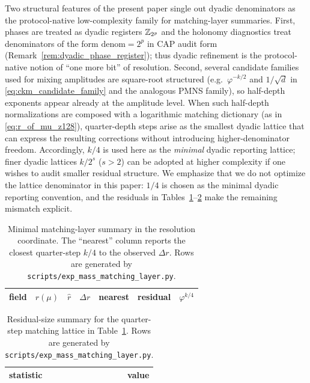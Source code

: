 \begin{remark}\label{rem:quarter_depth_minimal_dyadic}
Two structural features of the present paper single out dyadic denominators as the protocol-native low-complexity family for matching-layer summaries.
First, phases are treated as dyadic registers $\mathbb{Z}_{2^p}$ and the holonomy diagnostics treat denominators of the form $\mathrm{denom}=2^p$ in CAP audit form (Remark~\ref{rem:dyadic_phase_register}); thus dyadic refinement is the protocol-native notion of ``one more bit'' of resolution.
Second, several candidate families used for mixing amplitudes are square-root structured (e.g.\ $\varphi^{-k/2}$ and $1/\sqrt{d}$ in \eqref{eq:ckm_candidate_family} and the analogous PMNS family), so half-depth exponents appear already at the amplitude level.
When such half-depth normalizations are composed with a logarithmic matching dictionary (as in \eqref{eq:r_of_mu_z128}), quarter-depth steps arise as the smallest dyadic lattice that can express the resulting corrections without introducing higher-denominator freedom.
Accordingly, $k/4$ is used here as the \emph{minimal} dyadic reporting lattice; finer dyadic lattices $k/2^s$ ($s>2$) can be adopted at higher complexity if one wishes to audit smaller residual structure.
We emphasize that we do not optimize the lattice denominator in this paper: $1/4$ is chosen as the minimal dyadic reporting convention, and the residuals in Tables~\ref{tab:mass_matching_layer}--\ref{tab:mass_matching_layer_summary} make the remaining mismatch explicit.
\end{remark}

\begin{table}[t]
\centering
\small
\setlength{\tabcolsep}{6pt}
\renewcommand{\arraystretch}{1.15}
\begin{tabular}{lrrrrrr}
\toprule
field & $r(\mu)$ & $\widehat r$ & $\Delta r$ & nearest & residual & $\varphi^{k/4}$ \\
\midrule
%
\end{tabular}
\caption{Minimal matching-layer summary in the resolution coordinate. The ``nearest'' column reports the closest quarter-step $k/4$ to the observed $\Delta r$. Rows are generated by \texttt{scripts/exp\_mass\_matching\_layer.py}.}
\label{tab:mass_matching_layer}
\end{table}

\begin{table}[t]
\centering
\small
\setlength{\tabcolsep}{10pt}
\renewcommand{\arraystretch}{1.15}
\begin{tabular}{lr}
\toprule
statistic & value \\
\midrule
%
\end{tabular}
\caption{Residual-size summary for the quarter-step matching lattice in Table~\ref{tab:mass_matching_layer}. Rows are generated by \texttt{scripts/exp\_mass\_matching\_layer.py}.}
\label{tab:mass_matching_layer_summary}
\end{table}



